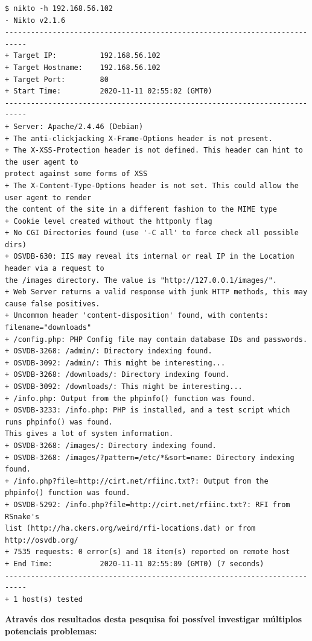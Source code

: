 \documentclass[10pt,english]{article}
\begin{document}
    \begin{lstlisting}
$ nikto -h 192.168.56.102                                                   
- Nikto v2.1.6
---------------------------------------------------------------------------
+ Target IP:          192.168.56.102
+ Target Hostname:    192.168.56.102
+ Target Port:        80
+ Start Time:         2020-11-11 02:55:02 (GMT0)
---------------------------------------------------------------------------
+ Server: Apache/2.4.46 (Debian)
+ The anti-clickjacking X-Frame-Options header is not present.
+ The X-XSS-Protection header is not defined. This header can hint to the user agent to 
protect against some forms of XSS
+ The X-Content-Type-Options header is not set. This could allow the user agent to render 
the content of the site in a different fashion to the MIME type
+ Cookie level created without the httponly flag
+ No CGI Directories found (use '-C all' to force check all possible dirs)
+ OSVDB-630: IIS may reveal its internal or real IP in the Location header via a request to 
the /images directory. The value is "http://127.0.0.1/images/".
+ Web Server returns a valid response with junk HTTP methods, this may cause false positives.
+ Uncommon header 'content-disposition' found, with contents: filename="downloads"
+ /config.php: PHP Config file may contain database IDs and passwords.
+ OSVDB-3268: /admin/: Directory indexing found.
+ OSVDB-3092: /admin/: This might be interesting...
+ OSVDB-3268: /downloads/: Directory indexing found.
+ OSVDB-3092: /downloads/: This might be interesting...
+ /info.php: Output from the phpinfo() function was found.
+ OSVDB-3233: /info.php: PHP is installed, and a test script which runs phpinfo() was found. 
This gives a lot of system information.
+ OSVDB-3268: /images/: Directory indexing found.
+ OSVDB-3268: /images/?pattern=/etc/*&sort=name: Directory indexing found.
+ /info.php?file=http://cirt.net/rfiinc.txt?: Output from the phpinfo() function was found.
+ OSVDB-5292: /info.php?file=http://cirt.net/rfiinc.txt?: RFI from RSnake's
list (http://ha.ckers.org/weird/rfi-locations.dat) or from http://osvdb.org/
+ 7535 requests: 0 error(s) and 18 item(s) reported on remote host
+ End Time:           2020-11-11 02:55:09 (GMT0) (7 seconds)
---------------------------------------------------------------------------
+ 1 host(s) tested
    \end{lstlisting}
    
    \par \textbf{Através dos resultados desta pesquisa foi possível investigar múltiplos potenciais problemas:}
    
\end{document}
